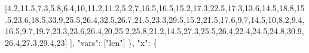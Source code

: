 \documentclass[
  letterpaper,
  DIV=11,
  numbers=noendperiod]{scrartcl}
\newenvironment{Shaded}{\begin{snugshade}}{\end{snugshade}}
\newcommand{\DecValTok}[1]{\textcolor[rgb]{0.68,0.00,0.00}{#1}}
\newcommand{\FloatTok}[1]{\textcolor[rgb]{0.68,0.00,0.00}{#1}}
\newcommand{\NormalTok}[1]{\textcolor[rgb]{0.00,0.23,0.31}{#1}}
\newcommand{\StringTok}[1]{\textcolor[rgb]{0.13,0.47,0.30}{#1}}
\begin{document}
\begin{Shaded}
\begin{Highlighting}[]
\NormalTok{         [}\FloatTok{4.2}\NormalTok{,}\FloatTok{11.5}\NormalTok{,}\FloatTok{7.3}\NormalTok{,}\FloatTok{5.8}\NormalTok{,}\FloatTok{6.4}\NormalTok{,}\DecValTok{10}\NormalTok{,}\FloatTok{11.2}\NormalTok{,}\FloatTok{11.2}\NormalTok{,}\FloatTok{5.2}\NormalTok{,}\DecValTok{7}\NormalTok{,}\FloatTok{16.5}\NormalTok{,}\FloatTok{16.5}\NormalTok{,}\FloatTok{15.2}\NormalTok{,}\FloatTok{17.3}\NormalTok{,}\FloatTok{22.5}\NormalTok{,}\FloatTok{17.3}\NormalTok{,}\FloatTok{13.6}\NormalTok{,}\FloatTok{14.5}\NormalTok{,}\FloatTok{18.8}\NormalTok{,}\FloatTok{15.5}\NormalTok{,}\FloatTok{23.6}\NormalTok{,}\FloatTok{18.5}\NormalTok{,}\FloatTok{33.9}\NormalTok{,}\FloatTok{25.5}\NormalTok{,}\FloatTok{26.4}\NormalTok{,}\FloatTok{32.5}\NormalTok{,}\FloatTok{26.7}\NormalTok{,}\FloatTok{21.5}\NormalTok{,}\FloatTok{23.3}\NormalTok{,}\FloatTok{29.5}\NormalTok{,}\FloatTok{15.2}\NormalTok{,}\FloatTok{21.5}\NormalTok{,}\FloatTok{17.6}\NormalTok{,}\FloatTok{9.7}\NormalTok{,}\FloatTok{14.5}\NormalTok{,}\DecValTok{10}\NormalTok{,}\FloatTok{8.2}\NormalTok{,}\FloatTok{9.4}\NormalTok{,}\FloatTok{16.5}\NormalTok{,}\FloatTok{9.7}\NormalTok{,}\FloatTok{19.7}\NormalTok{,}\FloatTok{23.3}\NormalTok{,}\FloatTok{23.6}\NormalTok{,}\FloatTok{26.4}\NormalTok{,}\DecValTok{20}\NormalTok{,}\FloatTok{25.2}\NormalTok{,}\FloatTok{25.8}\NormalTok{,}\FloatTok{21.2}\NormalTok{,}\FloatTok{14.5}\NormalTok{,}\FloatTok{27.3}\NormalTok{,}\FloatTok{25.5}\NormalTok{,}\FloatTok{26.4}\NormalTok{,}\FloatTok{22.4}\NormalTok{,}\FloatTok{24.5}\NormalTok{,}\FloatTok{24.8}\NormalTok{,}\FloatTok{30.9}\NormalTok{,}\FloatTok{26.4}\NormalTok{,}\FloatTok{27.3}\NormalTok{,}\FloatTok{29.4}\NormalTok{,}\DecValTok{23}\NormalTok{]}
\NormalTok{       ],}
       \StringTok{"vars"}\NormalTok{: [}\StringTok{"len"}\NormalTok{]}
\NormalTok{     \},}
     \StringTok{"x"}\NormalTok{: \{}

\end{Highlighting}
\end{Shaded}
\end{document}
